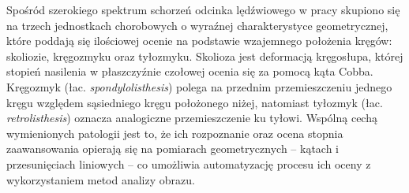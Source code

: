 Spośród szerokiego spektrum schorzeń odcinka lędźwiowego w pracy skupiono się na trzech jednostkach chorobowych o wyraźnej charakterystyce geometrycznej, które poddają się ilościowej ocenie na podstawie wzajemnego położenia kręgów: skoliozie, kręgozmyku oraz tyłozmyku.
Skolioza jest deformacją kręgosłupa, której stopień nasilenia w płaszczyźnie czołowej ocenia się  za pomocą kąta Cobba.
Kręgozmyk (łac. \textit{spondylolisthesis}) polega na przednim przemieszczeniu jednego kręgu względem sąsiedniego kręgu położonego niżej, natomiast tyłozmyk (łac. \textit{retrolisthesis}) oznacza analogiczne przemieszczenie ku tyłowi.
                                                                                                                                                                                                                                                                                                                                                                                                                                                                                                                                                                                                                                                                                                                                                                                                                                                                                                                                                                                                                                                                                                                                                                                                                                                                                                                                                                                                                                                                                                                                                                                                                                                                                                                                                                                                                                                                                                                                                                                                                                                                                                                                                                                                                                                                     Wspólną cechą wymienionych patologii jest to, że ich rozpoznanie oraz ocena stopnia zaawansowania opierają się na pomiarach geometrycznych -- kątach i przesunięciach liniowych -- co umożliwia automatyzację procesu ich oceny z wykorzystaniem metod analizy obrazu.

